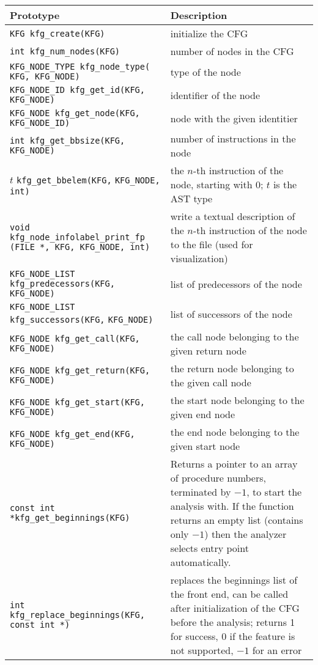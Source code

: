 \begin{longtable}{|p{} | p{}|}
\hline
Prototype & Description \\
\hline
\hline \endhead
\verb|KFG kfg_create(KFG)| & initialize the CFG \\
\hline
\verb|int kfg_num_nodes(KFG)| & number of nodes in the CFG \\
\hline
\verb|KFG_NODE_TYPE kfg_node_type(| \verb|KFG, KFG_NODE)|
    & type of the node \\
\hline
\verb|KFG_NODE_ID kfg_get_id(KFG,| \verb|KFG_NODE)|
    & identifier of the node \\
\hline
\verb|KFG_NODE kfg_get_node(KFG,| \verb|KFG_NODE_ID)|
    & node with the given identitier \\
\hline
\verb|int kfg_get_bbsize(KFG,| \verb|KFG_NODE)|
    & number of instructions in the node \\
\hline
\(t\) \verb|kfg_get_bbelem(KFG,| \verb|KFG_NODE, int)|
    & the \(n\)-th instruction of the node, starting with 0; \(t\) is
      the AST type \\
\hline
\raggedright \verb|void kfg_node_infolabel_print_fp|
    \verb|(FILE *, KFG, KFG_NODE, int)|
    & write a textual description of the \(n\)-th instruction of the node
      to the file (used for visualization) \\
\hline
\verb|KFG_NODE_LIST| \verb|kfg_predecessors(KFG,| \verb|KFG_NODE)|
    & list of predecessors of the node \\
\hline
\verb|KFG_NODE_LIST| \verb|kfg_successors(KFG,| \verb|KFG_NODE)|
    & list of successors of the node \\
\hline
\verb|KFG_NODE kfg_get_call(KFG,| \verb|KFG_NODE)|
    & the call node belonging to the given return node \\
\hline
\verb|KFG_NODE kfg_get_return(KFG,| \verb|KFG_NODE)|
    & the return node belonging to the given call node \\
\hline
\verb|KFG_NODE kfg_get_start(KFG,| \verb|KFG_NODE)|
    & the start node belonging to the gi\-ven end node \\
\hline
\verb|KFG_NODE kfg_get_end(KFG, KFG_NODE)|
    & the end node belonging to the given start node \\
\hline
\verb|const int *kfg_get_beginnings(KFG)|
    & Returns a pointer to an array of procedure numbers, terminated by
      \(-1\), to start the analysis with. If the function returns an
      empty list (contains only \(-1\)) then the analyzer selects entry
      point automatically. \\
\hline
\verb|int kfg_replace_beginnings(KFG,| \verb|const int *)|
    & replaces the beginnings list of the front end, can be called after
      initialization of the CFG before the analysis; returns 1 for
      success, 0 if the feature is not supported, \(-1\) for an error \\
\hline
\end{longtable}

